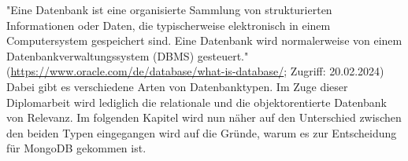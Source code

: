 "Eine Datenbank ist eine organisierte Sammlung von strukturierten Informationen oder Daten, die typischerweise elektronisch in einem Computersystem gespeichert sind. Eine Datenbank wird normalerweise von einem Datenbankverwaltungssystem (DBMS) gesteuert."
\newline
(\url{https://www.oracle.com/de/database/what-is-database/}; Zugriff: 20.02.2024)
\newline
Dabei gibt es verschiedene Arten von Datenbanktypen. Im Zuge dieser Diplomarbeit wird lediglich die relationale und die objektorentierte Datenbank von Relevanz. Im folgenden Kapitel wird nun näher auf den Unterschied zwischen den beiden Typen eingegangen wird auf die Gründe, warum es zur Entscheidung für MongoDB gekommen ist.
\cite{database_basics}